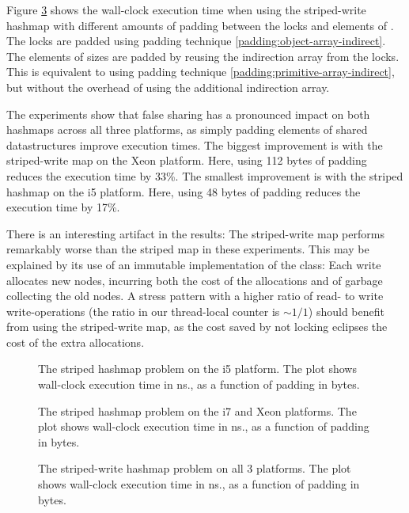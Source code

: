 Figure \ref{fig:hashmap-stripedwrite} shows the wall-clock execution time when
using the striped-write hashmap with different amounts of padding between the
locks and elements of . The locks are padded using padding technique
\ref{padding:object-array-indirect}. The elements of sizes are padded by reusing the
indirection array from the locks. This is equivalent to using padding technique
\ref{padding:primitive-array-indirect}, but without the overhead of using the
additional indirection array.

The experiments show that false sharing has a pronounced impact on both hashmaps
across all three platforms, as simply padding elements of shared datastructures
improve execution times.
The biggest improvement is with the striped-write map on the Xeon platform.
Here, using 112 bytes of padding reduces the execution time by 33\%. The
smallest improvement is with the striped hashmap on the i5 platform. Here, using
48 bytes of padding reduces the execution time by 17\%.

There is an interesting artifact in the results: The striped-write map performs
remarkably worse than the striped map in these experiments. This may be
explained by its use of an immutable implementation of the 
class: Each write allocates new nodes, incurring both the cost of the
allocations and of garbage collecting the old nodes. A stress pattern with a
higher ratio of read- to write write-operations (the ratio in our thread-local
counter is $\sim 1/1$) should benefit from using the striped-write map, as the
cost saved by not locking eclipses the cost of the extra allocations.

\begin{figure}[hbpt]
\graphicspath{{plots/}}

\caption{The striped hashmap problem on the i5 platform. The plot shows
	wall-clock execution time in ns., as a function of padding in bytes.}
\label{fig:hashmap-striped-i5}
\end{figure}

\begin{figure}[hbpt]
\graphicspath{{plots/}}

\caption{The striped hashmap problem on the i7 and Xeon platforms. The plot shows
	wall-clock execution time in ns., as a function of padding in bytes.}
\label{fig:hashmap-striped-i7-xeon}
\end{figure}

\begin{figure}[hbpt]
\graphicspath{{plots/}}

\caption{The striped-write hashmap problem on all 3 platforms. The plot shows
	wall-clock execution time in ns., as a function of padding in bytes.}
\label{fig:hashmap-stripedwrite}
\end{figure}
